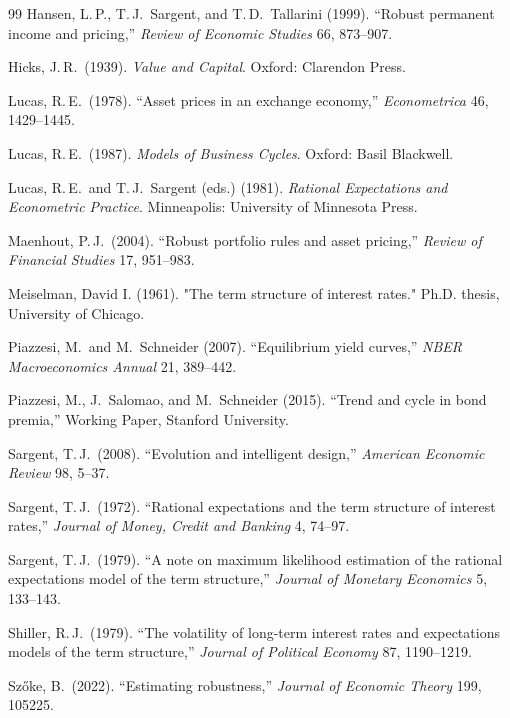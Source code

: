 \documentclass[12pt]{article}
\theoremstyle{definition}
\begin{document}
\begin{thebibliography}{99}
Hansen, L.\,P., T.\,J.\ Sargent, and T.\,D.\ Tallarini (1999).
``Robust permanent income and pricing,''
\textit{Review of Economic Studies} 66, 873--907.

Hicks, J.\,R.\ (1939).
\textit{Value and Capital}.
Oxford: Clarendon Press.

Lucas, R.\,E.\ (1978).
``Asset prices in an exchange economy,''
\textit{Econometrica} 46, 1429--1445.

Lucas, R.\,E.\ (1987).
\textit{Models of Business Cycles}.
Oxford: Basil Blackwell.

Lucas, R.\,E.\ and T.\,J.\ Sargent (eds.) (1981).
\textit{Rational Expectations and Econometric Practice}.
Minneapolis: University of Minnesota Press.

Maenhout, P.\,J.\ (2004).
``Robust portfolio rules and asset pricing,''
\textit{Review of Financial Studies} 17, 951--983.


Meiselman, David I. (1961). "The term structure of interest rates." Ph.D. thesis, University of Chicago.


Piazzesi, M.\ and M.\ Schneider (2007).
``Equilibrium yield curves,''
\textit{NBER Macroeconomics Annual} 21, 389--442.

Piazzesi, M., J.\ Salomao, and M.\ Schneider (2015).
``Trend and cycle in bond premia,''
Working Paper, Stanford University.

Sargent, T.\,J.\ (2008).
``Evolution and intelligent design,''
\textit{American Economic Review} 98, 5--37.

Sargent, T.\,J.\ (1972).
``Rational expectations and the term structure of interest rates,''
\textit{Journal of Money, Credit and Banking} 4, 74--97.

Sargent, T.\,J.\ (1979).
``A note on maximum likelihood estimation of the rational expectations
model of the term structure,''
\textit{Journal of Monetary Economics} 5, 133--143.

Shiller, R.\,J.\ (1979).
``The volatility of long-term interest rates and expectations models of
the term structure,''
\textit{Journal of Political Economy} 87, 1190--1219.

Sz\H{o}ke, B.\ (2022).
``Estimating robustness,''
\textit{Journal of Economic Theory} 199, 105225.

\end{thebibliography}
\end{document}

